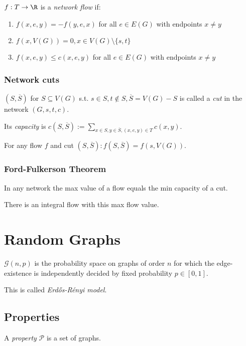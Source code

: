 $f : T \to \R$ is a \emph{network flow} if:

\begin{enumerate}
	\item $f(x,e,y) = -f(y,e,x)$ for all $e \in E(G)$ with endpoints $x \neq y$
	\item $f(x,V(G))=0, x \in V(G) \setminus \{s,t\}$
	\item $f(x,e,y) \leq c(x,e,y)$ for all $e \in E(G)$ with endpoints $x \neq y$
\end{enumerate}

\subsubsection*{Network cuts}

$(S,\overline S)$ for $S \subseteq V(G)$ s.t. $s \in S, t \notin S, \overline S = V(G)-S$ is called a \emph{cut} in the network $(G,s,t,c)$.

\spacing

Its \emph{capacity} is $c(S,\overline S) := \displaystyle\sum_{x \in S, y \in \overline S, (x,e,y) \in T} c(x,y)$.

\spacing

For any flow $f$ and cut $(S,\overline S) : f(S,\overline S) = f(s,V(G))$.

\subsubsection*{Ford-Fulkerson Theorem}

In any network the max value of a flow equals the min capacity of a cut.

There is an integral flow with this max flow value.

\section*{Random Graphs}

$\mathcal{G}(n,p)$ is the probability space on graphs of order $n$ for which the edge-existence is independently decided by fixed probability $p \in [0,1]$.

This is called \emph{Erd\H{o}s-R\'{e}nyi model}.

\subsection*{Properties}

A \emph{property} $\mathcal{P}$ is a set of graphs.

